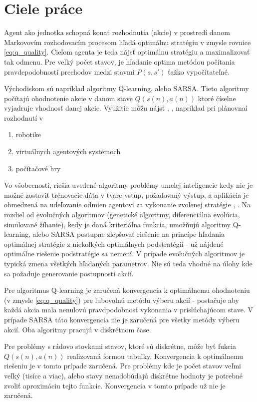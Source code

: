 \chapter{Ciele práce}

Agent ako jednotka schopná konať rozhodnutia (akcie) v prostredí danom Markovovím \cite{bib:markov_02}
rozhodovacím procesom hľadá optimálnu stratégiu v zmysle rovnice \ref{eq:q_quality}.
Cieľom agenta je teda nájsť optimálnu stratégiu a maximalizovať tak odmenu.
Pre veľký počet stavov, je hľadanie optima metódou počítania
pravdepodobností prechodov medzi stavmi $P(s, s')$ ťažko vypočítateľné.

Východiskom sú napríklad algoritmy Q-learning, alebo SARSA. Tieto algoritmy počítajú
ohodnotenie akcie v danom stave $Q(s(n), a(n))$ ktoré číselne vyjadruje vhodnosť
danej akcie. Využitie môžu nájsť \cite{bib:q_app_01}, \cite{bib:q_app_02}, \cite{bib:q_app_03} napríklad pri plánovnaí rozhodnutí v
\begin{enumerate}
  \item robotike
  \item virtuálnych agentových systémoch
  \item počítačové hry
\end{enumerate}

Vo všobecnosti, riešia uvedené algoritmy problémy umelej inteligencie kedy
nie je možné zostaviť trénovacie dáta v tvare vstup, požadovaný výstup, a aplikácia
je obmedzená na udeľovanie odmien agentovi za vykonanie zvolenej stratégie
\cite{bib:reinforcement_leraning_01}, \cite{bib:reinforcement_leraning_02}. Na rozdiel
od evolučných algoritmov (genetické algoritmy, diferenciálna evolúcia, simulované žíhanie),
kedy je daná kriteriálna funkcia, umožňujú algoritmy Q-learning, alebo SARSA
postupne zlepšovať riešenie na princípe hľadania optimálnej stratégie z niekoľkých
optimálnych podstratégií - už nájdené optimálne riešenie podstratégie sa nemení. V prípade evolučných
algoritmov je typická zmena všetkých hľadaných parametrov. Nie sú teda vhodné
na úlohy kde sa požaduje generovanie postupnosti akcií.

Pre algoritmus Q-learning je zaručená konvergencia k optimálnemu
ohodnoteniu (v zmysle \ref{eq:q_quality}) \cite{bib:q_conv_proof}
pre ľubovolnú metódu výberu
akcií - postačuje aby každá akcia mala nenulovú pravdpodobnosť vykonania v prislúchajúcom
stave. V prípade SARSA táto konvergencia nie je zaručená pre všetky metódy výberu akcií.
Oba algoritmy pracujú v diskrétnom čase.

Pre problémy s rádovo stovkami stavov, ktoré sú diskrétne, môže byť fukcia $Q(s(n), a(n))$ realizovaná
formou tabuľky. Konvergencia k optimálnemu riešeniu je v tomto prípade zaručená.
Pre problémy kde je počet stavov veľmi veľký (tisíce a viac), alebo stavy nenadobúdajú
diskrétne hodnoty je potrebné zvoliť aproximáciu tejto funkcie. Konvergencia v tomto
prípade už nie je zaručená.

